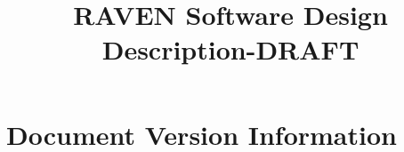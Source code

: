 \documentclass{article}
\title{RAVEN Software Design Description-DRAFT}
\begin{document}
\maketitle







\section*{Document Version Information}


\end{document}
